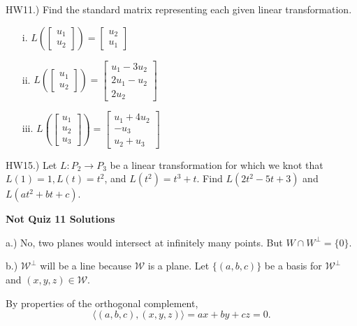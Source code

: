 \documentclass{article}
\begin{document}
HW11.) Find the standard matrix representing each given linear transformation. 

\begin{enumerate}
\item[i.] $L(\left[ \begin{array}{c}
u_1\\
u_2
\end{array} \right] ) = \left[ \begin{array}{c}
u_2\\
u_1
\end{array} \right]$

\item[ii.] $L(\left[ \begin{array}{c}
u_1\\
u_2
\end{array} \right] ) = \left[ \begin{array}{c}
u_1 - 3u_2\\
2u_1 - u_2\\
2u_2
\end{array} \right]$

\item[iii.] $L(\left[ \begin{array}{c}
u_1\\
u_2\\
u_3
\end{array} \right] ) = \left[ \begin{array}{c}
u_1 + 4u_2\\
-u_3\\
u_2+u_3
\end{array} \right]$

\end{enumerate}



HW15.) Let $L: P_2 \rightarrow P_3$ be a linear transformation for which we knot that $L(1)=1, L(t)=t^2$, and $L(t^2) = t^3+t$. Find $L(2t^2 - 5t +3)$ and $L(at^2+bt+c)$. 

\pagebreak

\textbf{Not Quiz 11 Solutions}

a.) No, two planes would intersect at infinitely many points. But $W\cap W^\perp = \{0\}$.

b.) $\mathcal{W}^\perp$ will be a line because $\mathcal{W}$ is a plane. Let $\{(a,b,c)\}$ be a basis for $\mathcal{W}^\perp$ and $(x,y,z)\in\mathcal{W}$. 

By properties of the orthogonal complement,
$$\langle (a,b,c),(x,y,z)\rangle = ax + by + cz=0.$$
\end{document}
